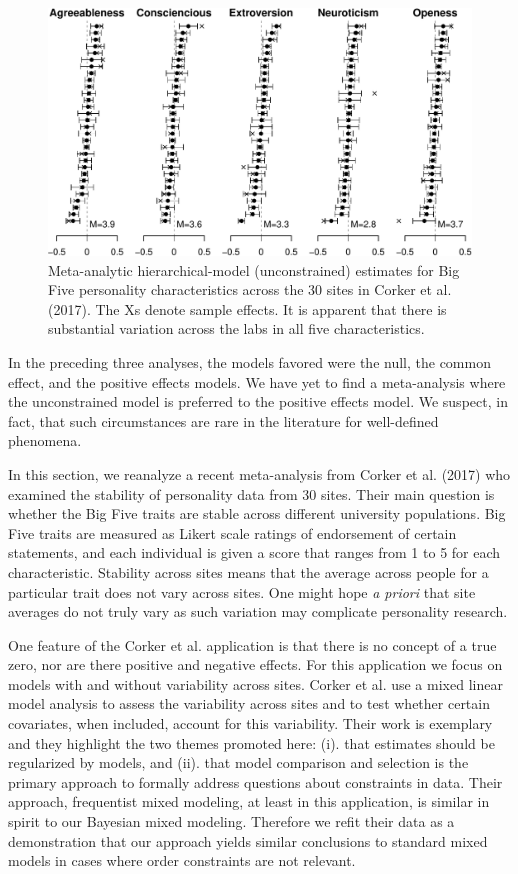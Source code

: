 \documentclass[english,man]{apa6}
\theoremstyle{definition}
\theoremstyle{definition}
\theoremstyle{remark}
\begin{document}
\begin{figure}[htbp]
\centering
\includegraphics{p_files/figure-latex/corkerEst-1.pdf}
\caption{\label{fig:corkerEst}Meta-analytic hierarchical-model
(unconstrained) estimates for Big Five personality characteristics
across the 30 sites in Corker et al. (2017). The Xs denote sample
effects. It is apparent that there is substantial variation across the
labs in all five characteristics.}
\end{figure}

In the preceding three analyses, the models favored were the null, the
common effect, and the positive effects models. We have yet to find a
meta-analysis where the unconstrained model is preferred to the positive
effects model. We suspect, in fact, that such circumstances are rare in
the literature for well-defined phenomena.

In this section, we reanalyze a recent meta-analysis from Corker et al.
(2017) who examined the stability of personality data from 30 sites.
Their main question is whether the Big Five traits are stable across
different university populations. Big Five traits are measured as Likert
scale ratings of endorsement of certain statements, and each individual
is given a score that ranges from 1 to 5 for each characteristic.
Stability across sites means that the average across people for a
particular trait does not vary across sites. One might hope \emph{a
priori} that site averages do not truly vary as such variation may
complicate personality research.

One feature of the Corker et al. application is that there is no concept
of a true zero, nor are there positive and negative effects. For this
application we focus on models with and without variability across
sites. Corker et al. use a mixed linear model analysis to assess the
variability across sites and to test whether certain covariates, when
included, account for this variability. Their work is exemplary and they
highlight the two themes promoted here: (i). that estimates should be
regularized by models, and (ii). that model comparison and selection is
the primary approach to formally address questions about constraints in
data. Their approach, frequentist mixed modeling, at least in this
application, is similar in spirit to our Bayesian mixed modeling.
Therefore we refit their data as a demonstration that our approach
yields similar conclusions to standard mixed models in cases where order
constraints are not relevant.
\end{document}
